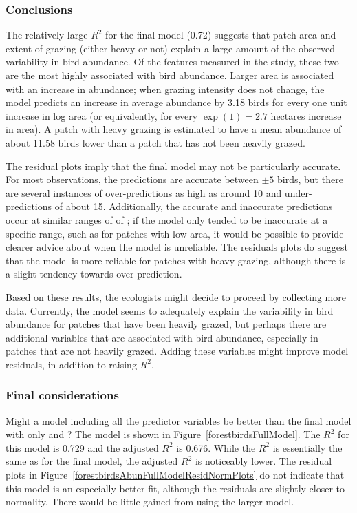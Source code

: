 \subsubsection{Conclusions}

The relatively large $R^2$ for the final model (0.72) suggests that patch area and extent of grazing (either heavy or not) explain a large amount of the observed variability in bird abundance. Of the features measured in the study, these two are the most highly associated with bird abundance. Larger area is associated with an increase in abundance; when grazing intensity does not change, the model predicts an increase in average abundance by 3.18 birds for every one unit increase in log area (or equivalently, for every $\exp(1) = 2.7$ hectares increase in area). A patch with heavy grazing is estimated to have a mean abundance of about 11.58 birds lower than a patch that has not been heavily grazed. 

The residual plots imply that the final model may not be particularly accurate. For most observations, the predictions are accurate between $\pm 5$ birds, but there are several instances of over-predictions as high as around 10 and under-predictions of about 15. Additionally, the accurate and inaccurate predictions occur at similar ranges of of ; if the model only tended to be inaccurate at a specific range, such as for patches with low area, it would be possible to provide clearer advice about when the model is unreliable. The residuals plots do suggest that the model is more reliable for patches with heavy grazing, although there is a slight tendency towards over-prediction.

Based on these results, the ecologists might decide to proceed by collecting more data. Currently, the model seems to adequately explain the variability in bird abundance for patches that have been heavily grazed, but perhaps there are additional variables that are associated with bird abundance, especially in patches that are not heavily grazed. Adding these variables might improve model residuals, in addition to raising $R^2$. 


\subsubsection{Final considerations}

Might a model including all the predictor variables be better than the final model with only  and ? The model is shown in Figure~\ref{forestbirdsFullModel}. The $R^2$ for this model is 0.729 and the adjusted $R^2$ is 0.676. While the $R^2$ is essentially the same as for the final model, the adjusted $R^2$ is noticeably lower. The residual plots in Figure~\ref{forestbirdsAbunFullModelResidNormPlots} do not indicate that this model is an especially better fit, although the residuals are slightly closer to normality. There would be little gained from using the larger model.

